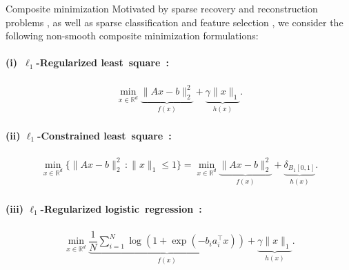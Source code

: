 \documentclass[11pt, a4paper, oneside, reqno]{amsart}
\makeatletter
\def\subsection{\@startsection{subsection}{2}%
	\z@{.5\linespacing\@plus.7\linespacing}{.5\linespacing}%
	{\normalfont\large\bfseries}}
\makeatother
\begin{document}
\subsection{Composite minimization}
Motivated by sparse recovery and reconstruction problems \cite{neykov2016l1, selesnick2017sparse, gaines2018algorithms}, as well as sparse classification and feature selection \cite{bertsimas2021sparse}, we consider the following non-smooth composite minimization formulations:

\paragraph{\bf (i)~$\ell_1$-Regularized least~square~\cite{neykov2016l1, selesnick2017sparse}:}
\begin{align}
\label{L1-reg}
    \min\limits_{x \in \mathbb{R}^d} \underbrace{\|Ax-b\|_{2}^2}_{f(x)} + \underbrace{\gamma \|x\|_1}_{h(x)}.
\end{align}

\paragraph{\bf (ii) $\ell_1$-Constrained least~square~\cite{gaines2018algorithms}:} 
\begin{align}
\label{L1-const}
\min\limits_{x \in \mathbb{R}^d} \{\|Ax-b\|_{2}^2 \, : \|x\|_1 \leq 1\} = \min\limits_{x \in \mathbb{R}^d} \underbrace{\|Ax-b\|_{2}^2}_{f(x)} + \underbrace{\delta_{B_1[0, 1]}}_{h(x)}.
\end{align}

\paragraph{\bf (iii) $\ell_1$-Regularized logistic~regression~\cite{bertsimas2021sparse}:} 
\begin{align}
\label{L1-log-reg}
\min\limits_{x \in \mathbb{R}^d}  \underbrace{\dfrac{1}{N} \sum_{i=1}^{N} \log \left(1+\exp(-b_i a_{i}^\top x)\right)}_{f(x)} + \underbrace{\gamma \|x\|_1}_{h(x)}.
\end{align}
\end{document}
